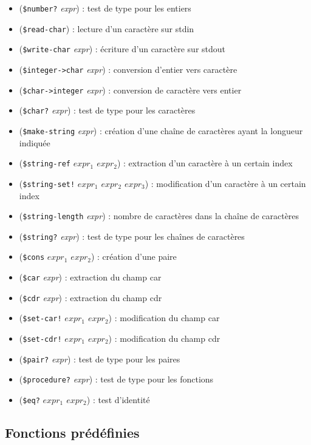 \documentclass[12pt]{article}
\begin{document}
\begin{itemize}
\item (\texttt{\$number?} \textit{expr}) : test de type pour les entiers
\item (\texttt{\$read-char}) : lecture d'un caractère sur stdin
\item (\texttt{\$write-char} \textit{expr}) : écriture d'un caractère sur stdout
\item (\texttt{\$integer->char} \textit{expr}) : conversion d'entier vers caractère
\item (\texttt{\$char->integer} \textit{expr}) : conversion de caractère vers entier
\item (\texttt{\$char?} \textit{expr}) : test de type pour les caractères
\item (\texttt{\$make-string} \textit{expr}) : création d'une chaîne de caractères ayant la longueur indiquée 
\item (\texttt{\$string-ref} \textit{$expr_1$ $expr_2$}) : extraction d'un caractère à un certain index
\item (\texttt{\$string-set!} \textit{$expr_1$ $expr_2$ $expr_3$}) : modification d'un caractère à un certain index
\item (\texttt{\$string-length} \textit{expr}) : nombre de caractères dans la chaîne de caractères
\item (\texttt{\$string?} \textit{expr}) : test de type pour les chaînes de caractères
\item (\texttt{\$cons} \textit{$expr_1$ $expr_2$}) : création d'une paire
\item (\texttt{\$car} \textit{expr}) : extraction du champ car
\item (\texttt{\$cdr} \textit{expr}) : extraction du champ cdr
\item (\texttt{\$set-car!} \textit{$expr_1$ $expr_2$}) : modification du champ car
\item (\texttt{\$set-cdr!} \textit{$expr_1$ $expr_2$}) : modification du champ cdr
\item (\texttt{\$pair?} \textit{expr}) : test de type pour les paires
\item (\texttt{\$procedure?} \textit{expr}) : test de type pour les fonctions
\item (\texttt{\$eq?} \textit{$expr_1$ $expr_2$}) : test d'identité
\end{itemize}

\subsection{Fonctions prédéfinies}
\end{document}

